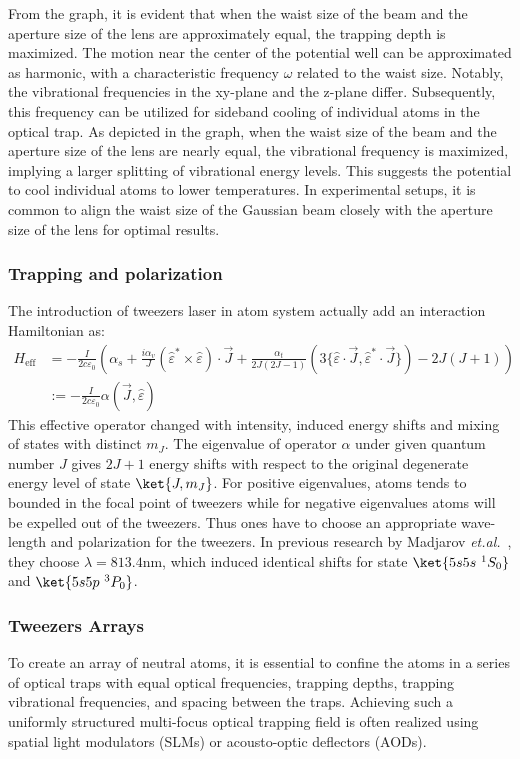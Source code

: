 \documentclass[11pt]{article}
\begin{document}
 From the graph, it is evident that when the waist size of the beam and the aperture size of the lens are approximately equal, the trapping depth is maximized. The motion near the center of the potential well can be approximated as harmonic, with a characteristic frequency $\omega$ related to the waist size. Notably, the vibrational frequencies in the xy-plane and the z-plane differ. Subsequently, this frequency can be utilized for sideband cooling of individual atoms in the optical trap. As depicted in the graph, when the waist size of the beam and the aperture size of the lens are nearly equal, the vibrational frequency is maximized, implying a larger splitting of vibrational energy levels. This suggests the potential to cool individual atoms to lower temperatures. In experimental setups, it is common to align the waist size of the Gaussian beam closely with the aperture size of the lens for optimal results.

\subsubsection{Trapping and polarization}
The introduction of tweezers laser in atom system actually add an interaction Hamiltonian as:
\begin{align}
    H_{\text{eff}} &= - \frac{I}{2c\varepsilon_0}\left(\alpha_s + \frac{i\alpha_v}{J}(\hat{\varepsilon}^* \times \hat{\varepsilon})\cdot \vec{J} + \frac{\alpha_t}{2J(2J - 1)}(3\{\hat{\varepsilon}\cdot \vec{J},\hat{\varepsilon}^*\cdot \vec{J}\}) - 2J(J+1)\right) \\
    &:=- \frac{I}{2c\varepsilon_0} \alpha(\vec{J},\hat{\varepsilon})
\end{align}
This effective operator changed with intensity, induced energy shifts and mixing of states with distinct $m_J$. The eigenvalue of operator $\alpha$ under given quantum number $J$ gives $2J+1$ energy shifts with respect to the original degenerate energy level of state $\ket{J,m_J}$. For positive eigenvalues, atoms tends to bounded in the focal point of tweezers while for negative eigenvalues atoms will be expelled out of the tweezers. Thus ones have to choose an appropriate wave-length and polarization for the tweezers. In previous research by Madjarov \emph{et.al.}~\cite{ThesisMIT}, they choose $\lambda = 813.4\text{nm}$, which induced identical shifts for state $\ket{5s5s~^{1}S_0}$ and    $\ket{5s5p~^{3}P_0}$.
 \subsubsection{Tweezers Arrays}
To create an array of neutral atoms, it is essential to confine the atoms in a series of optical traps with equal optical frequencies, trapping depths, trapping vibrational frequencies, and spacing between the traps. Achieving such a uniformly structured multi-focus optical trapping field is often realized using spatial light modulators (SLMs) or acousto-optic deflectors (AODs).
\end{document}
